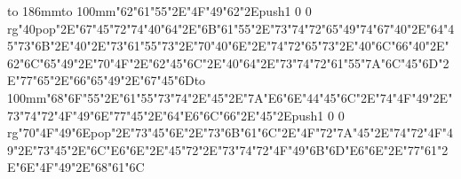 \hbox to 186mm{\hsize=81mm\vbox to 100mm{\vfill\ipa\char"62\ipa\char"61\ipa\char"55\ipa\char"2E\ipa\char"4F\ipa\char"49\ipa\char"62\ipa\char"2E\pdfcolorstack\match push{1 0 0 rg}\ipa\char"40\pdfcolorstack\match pop{}\ipa\char"2E\ipa\char"67\ipa\char"45\ipa\char"72\medskip\ipa\char"74\ipa\char"40\ipa\char"64\ipa\char"2E\ipa\char"6B\ipa\char"61\ipa\char"55\ipa\char"2E\ipa\char"73\ipa\char"74\ipa\char"72\ipa\char"65\ipa\char"49\ipa\char"74\medskip\ipa\char"67\ipa\char"40\ipa\char"2E\ipa\char"64\ipa\char"45\ipa\char"73\ipa\char"6B\ipa\char"2E\ipa\char"40\ipa\char"2E\ipa\char"73\ipa\char"61\ipa\char"55\ipa\char"73\ipa\char"2E\ipa\char"70\ipa\char"40\ipa\char"6E\ipa\char"2E\ipa\char"74\ipa\char"72\ipa\char"65\ipa\char"73\ipa\char"2E\ipa\char"40\ipa\char"6C\ipa\char"66\medskip\ipa\char"40\ipa\char"2E\ipa\char"62\ipa\char"6C\ipa\char"65\ipa\char"49\ipa\char"2E\ipa\char"70\ipa\char"4F\ipa\char"2E\ipa\char"62\ipa\char"45\ipa\char"6C\ipa\char"2E\ipa\char"40\ipa\char"64\ipa\char"2E\ipa\char"73\ipa\char"74\ipa\char"72\ipa\char"61\ipa\char"55\ipa\char"7A\medskip\ipa\char"6C\ipa\char"45\ipa\char"6D\ipa\char"2E\ipa\char"77\ipa\char"65\ipa\char"2E\ipa\char"66\ipa\char"65\ipa\char"49\ipa\char"2E\ipa\char"67\ipa\char"45\ipa\char"6D\vfill}\hfill\vbox to 100mm{\vfill\ipa\char"68\ipa\char"6F\ipa\char"55\ipa\char"2E\ipa\char"61\ipa\char"55\ipa\char"73\ipa\char"74\ipa\char"2E\ipa\char"45\ipa\char"2E\ipa\char"7A\ipa\char"E6\ipa\char"6E\medskip\ipa\char"44\ipa\char"45\ipa\char"6C\ipa\char"2E\ipa\char"74\ipa\char"4F\ipa\char"49\ipa\char"2E\ipa\char"73\ipa\char"74\ipa\char"72\ipa\char"4F\ipa\char"49\ipa\char"6E\medskip\ipa\char"77\ipa\char"45\ipa\char"2E\ipa\char"64\ipa\char"E6\ipa\char"6C\ipa\char"66\ipa\char"2E\ipa\char"45\ipa\char"2E\pdfcolorstack\match push{1 0 0 rg}\ipa\char"70\ipa\char"4F\ipa\char"49\ipa\char"6E\pdfcolorstack\match pop{}\ipa\char"2E\ipa\char"73\ipa\char"45\ipa\char"6E\ipa\char"2E\ipa\char"73\ipa\char"6B\ipa\char"61\ipa\char"6C\ipa\char"2E\ipa\char"4F\ipa\char"72\ipa\char"7A\medskip\ipa\char"45\ipa\char"2E\ipa\char"74\ipa\char"72\ipa\char"4F\ipa\char"49\ipa\char"2E\ipa\char"73\ipa\char"45\ipa\char"2E\ipa\char"6C\ipa\char"E6\ipa\char"6E\ipa\char"2E\ipa\char"45\ipa\char"72\ipa\char"2E\ipa\char"73\ipa\char"74\ipa\char"72\ipa\char"4F\ipa\char"49\ipa\char"6B\medskip\ipa\char"6D\ipa\char"E6\ipa\char"6E\ipa\char"2E\ipa\char"77\ipa\char"61\ipa\char"2E\ipa\char"6E\ipa\char"4F\ipa\char"49\ipa\char"2E\ipa\char"68\ipa\char"61\ipa\char"6C\vfill}}\eject
